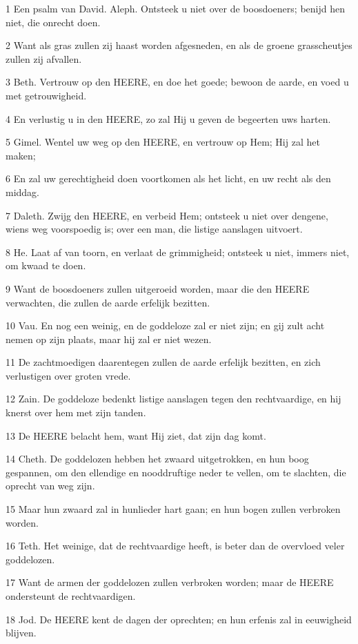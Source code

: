 \par 1 Een psalm van David. Aleph. Ontsteek u niet over de boosdoeners; benijd hen niet, die onrecht doen.
\par 2 Want als gras zullen zij haast worden afgesneden, en als de groene grasscheutjes zullen zij afvallen.
\par 3 Beth. Vertrouw op den HEERE, en doe het goede; bewoon de aarde, en voed u met getrouwigheid.
\par 4 En verlustig u in den HEERE, zo zal Hij u geven de begeerten uws harten.
\par 5 Gimel. Wentel uw weg op den HEERE, en vertrouw op Hem; Hij zal het maken;
\par 6 En zal uw gerechtigheid doen voortkomen als het licht, en uw recht als den middag.
\par 7 Daleth. Zwijg den HEERE, en verbeid Hem; ontsteek u niet over dengene, wiens weg voorspoedig is; over een man, die listige aanslagen uitvoert.
\par 8 He. Laat af van toorn, en verlaat de grimmigheid; ontsteek u niet, immers niet, om kwaad te doen.
\par 9 Want de boosdoeners zullen uitgeroeid worden, maar die den HEERE verwachten, die zullen de aarde erfelijk bezitten.
\par 10 Vau. En nog een weinig, en de goddeloze zal er niet zijn; en gij zult acht nemen op zijn plaats, maar hij zal er niet wezen.
\par 11 De zachtmoedigen daarentegen zullen de aarde erfelijk bezitten, en zich verlustigen over groten vrede.
\par 12 Zain. De goddeloze bedenkt listige aanslagen tegen den rechtvaardige, en hij knerst over hem met zijn tanden.
\par 13 De HEERE belacht hem, want Hij ziet, dat zijn dag komt.
\par 14 Cheth. De goddelozen hebben het zwaard uitgetrokken, en hun boog gespannen, om den ellendige en nooddruftige neder te vellen, om te slachten, die oprecht van weg zijn.
\par 15 Maar hun zwaard zal in hunlieder hart gaan; en hun bogen zullen verbroken worden.
\par 16 Teth. Het weinige, dat de rechtvaardige heeft, is beter dan de overvloed veler goddelozen.
\par 17 Want de armen der goddelozen zullen verbroken worden; maar de HEERE ondersteunt de rechtvaardigen.
\par 18 Jod. De HEERE kent de dagen der oprechten; en hun erfenis zal in eeuwigheid blijven.
